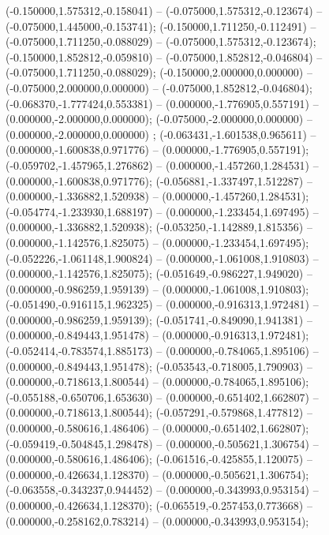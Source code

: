  (-0.150000,1.575312,-0.158041) -- (-0.075000,1.575312,-0.123674) -- (-0.075000,1.445000,-0.153741);
 (-0.150000,1.711250,-0.112491) -- (-0.075000,1.711250,-0.088029) -- (-0.075000,1.575312,-0.123674);
 (-0.150000,1.852812,-0.059810) -- (-0.075000,1.852812,-0.046804) -- (-0.075000,1.711250,-0.088029);
 (-0.150000,2.000000,0.000000) -- (-0.075000,2.000000,0.000000) -- (-0.075000,1.852812,-0.046804);
 (-0.068370,-1.777424,0.553381) -- (0.000000,-1.776905,0.557191) -- (0.000000,-2.000000,0.000000);
 (-0.075000,-2.000000,0.000000) -- (0.000000,-2.000000,0.000000) ;
 (-0.063431,-1.601538,0.965611) -- (0.000000,-1.600838,0.971776) -- (0.000000,-1.776905,0.557191);
 (-0.059702,-1.457965,1.276862) -- (0.000000,-1.457260,1.284531) -- (0.000000,-1.600838,0.971776);
 (-0.056881,-1.337497,1.512287) -- (0.000000,-1.336882,1.520938) -- (0.000000,-1.457260,1.284531);
 (-0.054774,-1.233930,1.688197) -- (0.000000,-1.233454,1.697495) -- (0.000000,-1.336882,1.520938);
 (-0.053250,-1.142889,1.815356) -- (0.000000,-1.142576,1.825075) -- (0.000000,-1.233454,1.697495);
 (-0.052226,-1.061148,1.900824) -- (0.000000,-1.061008,1.910803) -- (0.000000,-1.142576,1.825075);
 (-0.051649,-0.986227,1.949020) -- (0.000000,-0.986259,1.959139) -- (0.000000,-1.061008,1.910803);
 (-0.051490,-0.916115,1.962325) -- (0.000000,-0.916313,1.972481) -- (0.000000,-0.986259,1.959139);
 (-0.051741,-0.849090,1.941381) -- (0.000000,-0.849443,1.951478) -- (0.000000,-0.916313,1.972481);
 (-0.052414,-0.783574,1.885173) -- (0.000000,-0.784065,1.895106) -- (0.000000,-0.849443,1.951478);
 (-0.053543,-0.718005,1.790903) -- (0.000000,-0.718613,1.800544) -- (0.000000,-0.784065,1.895106);
 (-0.055188,-0.650706,1.653630) -- (0.000000,-0.651402,1.662807) -- (0.000000,-0.718613,1.800544);
 (-0.057291,-0.579868,1.477812) -- (0.000000,-0.580616,1.486406) -- (0.000000,-0.651402,1.662807);
 (-0.059419,-0.504845,1.298478) -- (0.000000,-0.505621,1.306754) -- (0.000000,-0.580616,1.486406);
 (-0.061516,-0.425855,1.120075) -- (0.000000,-0.426634,1.128370) -- (0.000000,-0.505621,1.306754);
 (-0.063558,-0.343237,0.944452) -- (0.000000,-0.343993,0.953154) -- (0.000000,-0.426634,1.128370);
 (-0.065519,-0.257453,0.773668) -- (0.000000,-0.258162,0.783214) -- (0.000000,-0.343993,0.953154);

